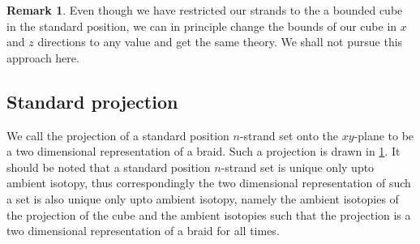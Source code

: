 \documentclass[oneside]{book}
\theoremstyle{definition}
\newtheorem{remark}[thm]{Remark}
\begin{document}
	\begin{remark}
		Even though we have restricted our strands to the a bounded cube in the standard position, we can in principle change the bounds of our cube in \(x\) and \(z\) directions to any value and get the same theory. We shall not pursue this approach here.
	\end{remark}

	\subsection{Standard projection}

	We call the projection of a standard position \(n\)-strand set onto the \(xy\)-plane to be a two dimensional representation of a braid. Such a projection is drawn in \cref{fig:2drepbraids}. It should be noted that a standard position \(n\)-strand set is unique only upto ambient isotopy, thus correspondingly the two dimensional representation of such a set is also unique only upto ambient isotopy, namely the ambient isotopies of the projection of the cube and the ambient isotopies such that the projection is a two dimensional representation of a braid for all times.

	\begin{figure}[H]
		\centering
		\label{fig:2drepbraids}
	\end{figure}
\end{document}
